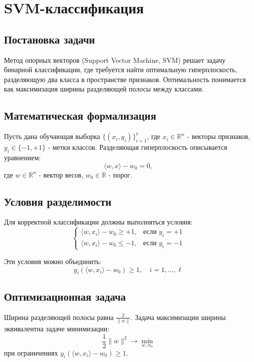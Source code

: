 \section{SVM-классификация}
\subsection{Постановка задачи}
\par Метод опорных векторов (Support Vector Machine, SVM) решает задачу бинарной классификации, где требуется найти оптимальную гиперплоскость, разделяющую два класса в пространстве признаков. Оптимальность понимается как максимизация ширины разделяющей полосы между классами.

\subsection{Математическая формализация}
\par Пусть дана обучающая выборка \( \{(x_i, y_i)\}_{i=1}^{\ell} \), где \( x_i \in \mathbb{R}^n \) - векторы признаков, \( y_i \in \{-1,+1\} \) - метки классов. Разделяющая гиперплоскость описывается уравнением:
\begin{equation*}
    \langle w,x \rangle - w_0 = 0,
\end{equation*}
где \( w \in \mathbb{R}^n \) - вектор весов, \( w_0 \in \mathbb{R} \) - порог.

\subsection{Условия разделимости}
\par Для корректной классификации должны выполняться условия:
\begin{equation*}
    \begin{cases}
        \langle w,x_i \rangle - w_0 \geq +1, & \text{если } y_i = +1 \\
        \langle w,x_i \rangle - w_0 \leq -1, & \text{если } y_i = -1
    \end{cases}
\end{equation*}
\par Эти условия можно объединить:
\begin{equation*}
    y_i(\langle w,x_i \rangle - w_0) \geq 1, \quad i = 1,\ldots,\ell
\end{equation*}

\subsection{Оптимизационная задача}
\par Ширина разделяющей полосы равна \( \frac{2}{\|w\|} \). Задача максимизации ширины эквивалентна задаче минимизации:
\begin{equation*}
    \frac{1}{2}\|w\|^2 \to \min_{w,w_0}
\end{equation*}
при ограничениях \( y_i(\langle w,x_i \rangle - w_0) \geq 1 \).

